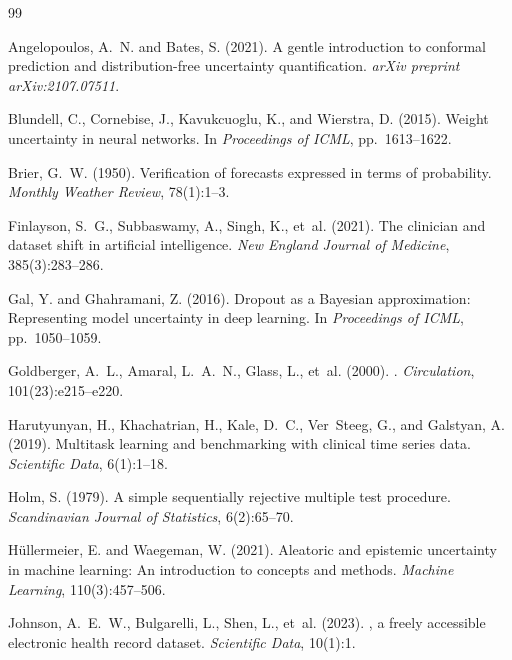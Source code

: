 \documentclass[11pt,a4paper]{article}
\begin{document}
\begin{thebibliography}{99}

Angelopoulos, A.~N. and Bates, S. (2021).
\newblock A gentle introduction to conformal prediction and distribution-free uncertainty quantification.
\newblock \textit{arXiv preprint arXiv:2107.07511}.

Blundell, C., Cornebise, J., Kavukcuoglu, K., and Wierstra, D. (2015).
\newblock Weight uncertainty in neural networks.
\newblock In \textit{Proceedings of ICML}, pp.~1613--1622.

Brier, G.~W. (1950).
\newblock Verification of forecasts expressed in terms of probability.
\newblock \textit{Monthly Weather Review}, 78(1):1--3.

Finlayson, S.~G., Subbaswamy, A., Singh, K., et~al. (2021).
\newblock The clinician and dataset shift in artificial intelligence.
\newblock \textit{New England Journal of Medicine}, 385(3):283--286.

Gal, Y. and Ghahramani, Z. (2016).
\newblock Dropout as a {Bayesian} approximation: Representing model uncertainty in deep learning.
\newblock In \textit{Proceedings of ICML}, pp.~1050--1059.

Goldberger, A.~L., Amaral, L.~A.~N., Glass, L., et~al. (2000).
.
\newblock \textit{Circulation}, 101(23):e215--e220.

Harutyunyan, H., Khachatrian, H., Kale, D.~C., Ver~Steeg, G., and Galstyan, A. (2019).
\newblock Multitask learning and benchmarking with clinical time series data.
\newblock \textit{Scientific Data}, 6(1):1--18.

Holm, S. (1979).
\newblock A simple sequentially rejective multiple test procedure.
\newblock \textit{Scandinavian Journal of Statistics}, 6(2):65--70.

H{\"u}llermeier, E. and Waegeman, W. (2021).
\newblock Aleatoric and epistemic uncertainty in machine learning: An introduction to concepts and methods.
\newblock \textit{Machine Learning}, 110(3):457--506.

Johnson, A.~E.~W., Bulgarelli, L., Shen, L., et~al. (2023).
, a freely accessible electronic health record dataset.
\newblock \textit{Scientific Data}, 10(1):1.


\end{thebibliography}
\end{document}
